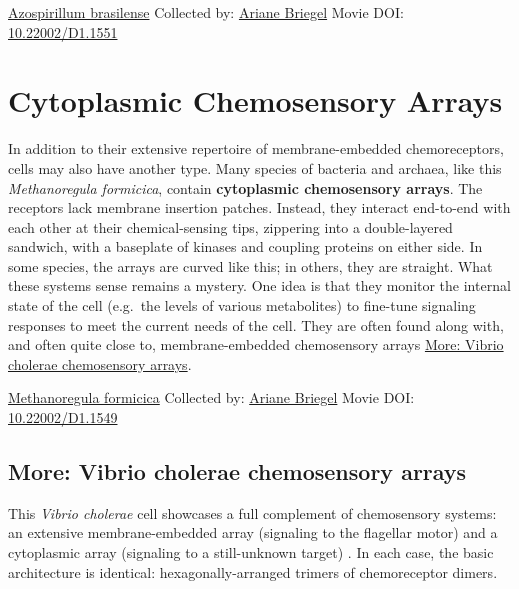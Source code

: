 \documentclass[]{tufte-book}
\begin{document}
\hypertarget{htmlwidget-a8d16dd83125aeee14fe}{}

\label{fig:7-4a}\protect\hyperlink{tree}{Azospirillum brasilense} Collected by: \protect\hyperlink{ariane_briegel}{Ariane Briegel} Movie DOI: \href{https://doi.org/10.22002/D1.1551}{10.22002/D1.1551}

\hypertarget{cytoplasmic-chemosensory-arrays}{%
\section{Cytoplasmic Chemosensory Arrays}\label{cytoplasmic-chemosensory-arrays}}

In addition to their extensive repertoire of membrane-embedded chemoreceptors, cells may also have another type. Many species of bacteria and archaea, like this \emph{Methanoregula formicica}, contain \textbf{cytoplasmic chemosensory arrays}. The receptors lack membrane insertion patches. Instead, they interact end-to-end with each other at their chemical-sensing tips, zippering into a double-layered sandwich, with a baseplate of kinases and coupling proteins on either side. In some species, the arrays are curved like this; in others, they are straight. What these systems sense remains a mystery. One idea is that they monitor the internal state of the cell (e.g.~the levels of various metabolites) to fine-tune signaling responses to meet the current needs of the cell. They are often found along with, and often quite close to, membrane-embedded chemosensory arrays \protect\hyperlink{Vibrio_cholerae_chemosensory_arrays}{More: Vibrio cholerae chemosensory arrays}.



\hypertarget{htmlwidget-b553c9982d3b06939d01}{}

\label{fig:7-5}\protect\hyperlink{tree}{Methanoregula formicica} Collected by: \protect\hyperlink{ariane_briegel}{Ariane Briegel} Movie DOI: \href{https://doi.org/10.22002/D1.1549}{10.22002/D1.1549}

\hypertarget{Vibrio_cholerae_chemosensory_arrays}{%
\subsection*{More: Vibrio cholerae chemosensory arrays}\label{Vibrio_cholerae_chemosensory_arrays}}

This \emph{Vibrio cholerae} cell showcases a full complement of chemosensory systems: an extensive membrane-embedded array (signaling to the flagellar motor) and a cytoplasmic array (signaling to a still-unknown target) . In each case, the basic architecture is identical: hexagonally-arranged trimers of chemoreceptor dimers.
\end{document}
